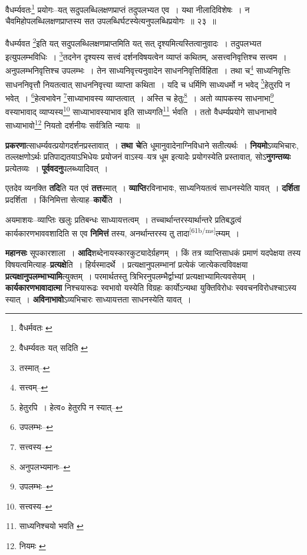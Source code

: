 \documentclass[article,12pt,a4paper]{memoir}
\begin{document}
	  \pstart वैधर्म्यवतः\footnote{वैधर्मवतः \cite{dp-edE}} प्रयोगः--यत् सदुपलब्धिलक्षणप्राप्तं तदुपलभ्यत एव । यथा नीलादिविशेषः । न चैवमिहोपलब्धिलक्षणप्राप्तस्य सत उपलब्धिर्घटस्येत्यनुपलब्धिप्रयोगः ॥ २३ ॥
	\pend
       

	  \pstart वैधर्म्यवत \footnote{वैधर्म्यवतः यत् सदिति \cite{dp-msC}}इति यत् सदुपलब्धिलक्षणप्राप्तमिति यत् सत् दृश्यमित्यस्तित्वानुवादः । तदुपलभ्यत इत्युपलम्भविधिः । \footnote{तस्मात्--\cite{dp-msD-n}}तदनेन दृश्यस्य सत्त्वं दर्शनविषयत्वेन व्याप्तं कथितम्, असत्त्वनिवृत्तिश्च सत्त्वम । अनुपलम्भनिवृत्तिश्च उपलम्भः । तेन साध्यनिवृत्त्यनुवादेन साधननिवृत्तिर्विहिता । तथा च\footnote{सत्त्वम्--\cite{dp-msD-n}} साध्यनिवृत्तिः साधननिवृत्तौ नियतत्वात् साधननिवृत्त्या व्याप्ता कथिता । यदि च धर्मिणि साध्यधर्मो न भवेद् \footnote{हेतुरपि । हेत्व० \cite{dp-msB} \cite{dp-edP} \cite{dp-edH} हेतुरपि न स्यात्--\cite{dp-msD}}हेतुरपि न भवेत् । \footnote{उपलम्भः--\cite{dp-msD-n}}हेत्वभावेन \footnote{सत्त्वस्य--\cite{dp-msD-n}}साध्याभावस्य व्याप्तत्वात् । अस्ति च हेतुः\footnote{अनुपलभ्यमानः--\cite{dp-msD-n}} । अतो व्यापकस्य साधनाभा\footnote{उपलम्भः--\cite{dp-msD-n}} वस्याभावाद् व्याप्यस्य\footnote{सत्त्वस्य--\cite{dp-msD-n}} साध्याभावस्याभाव इति साध्यगति\footnote{साध्यनिश्चयो भवति \cite{dp-msA} \cite{dp-msB} \cite{dp-msC} \cite{dp-msD} \cite{dp-edP} \cite{dp-edH} \cite{dp-edE} \cite{dp-edN}} र्भवति । ततो वैधर्म्यप्रयोगे साधनाभावे साध्याभावो\footnote{नियमः \cite{dp-msB}} नियतो दर्शनीयः सर्वत्रिति न्यायः ॥
	\pend
      

	  \pstart \textbf{प्रकरणा}त्साधर्म्यवत्प्रयोगदर्शनप्रस्तावात् । \textbf{तथा चे}ति धूमानुवादेनाग्निविधाने सतीत्यर्थः । \textbf{नियमो}ऽव्यभिचारः, तल्लक्षणोऽर्थः प्रतिपाद्यतयाऽभिधेयः प्रयोजनं वाऽस्य--यत्र धूम इत्यादेः प्रयोगस्येति प्रस्तावात्, सोऽ\textbf{नुगन्तव्यः} प्रत्येतव्यः । \textbf{पूर्ववदनु}पलब्ध्यादिवत् ।
	\pend
      

	  \pstart एतदेव व्यनक्ति \textbf{तदि}ति यत एवं \textbf{तत्त}स्मात् । \textbf{व्याप्ति}रविनाभावः, साध्यनियतत्वं साधनस्येति यावत् । \textbf{दर्शिता} प्रदर्शिता । किंनिमित्ता सेत्याह--\textbf{कार्ये}ति ।
	\pend
      

	  \pstart अयमाशयः--व्याप्तिः खलुः प्रतिबन्धः साध्यायत्तत्वम् । तच्चार्थान्तरस्यार्थान्तरे प्रतिबद्धत्वं कार्यकारणभाववशादिति स एव \textbf{निमित्तं} तस्य, अनर्थान्तरस्य तु तादा\leavevmode\textsuperscript{\rmlatinfont\tiny [61b/ms]}त्म्यम् ।
	\pend
      

	  \pstart \textbf{महानसः} सूपकारशाला । \textbf{आदि}शब्देनायस्कारकुट्यादेर्ग्रहणम् । किं तत्र व्याप्तिसाधकं प्रमाणं यदपेक्षया तस्य विषयत्वमित्याह--\textbf{प्रत्यक्षे}ति । हिर्यस्मादर्थे । प्रत्यक्षानुपलम्भानां प्रत्येकं जात्येकत्वविवक्षया \textbf{प्रत्यक्षानुपलम्भाभ्यामि}त्युक्तम् । परमार्थतस्तु त्रिभिरनुपलम्भैर्द्वाभ्यां प्रत्यक्षाभ्यामित्यवसेयम् । \textbf{कार्यकारणभावादात्मा} निश्चयारूढः स्वभावो यस्येति विग्रहः कार्योऽन्यथा युक्तिविरोधः स्ववचनविरोधश्चाऽस्य स्यात् । \textbf{अविनाभावो}ऽव्यभिचारः साध्यायत्तता साधनस्येति यावत् ।
	\pend
      
\end{document}
